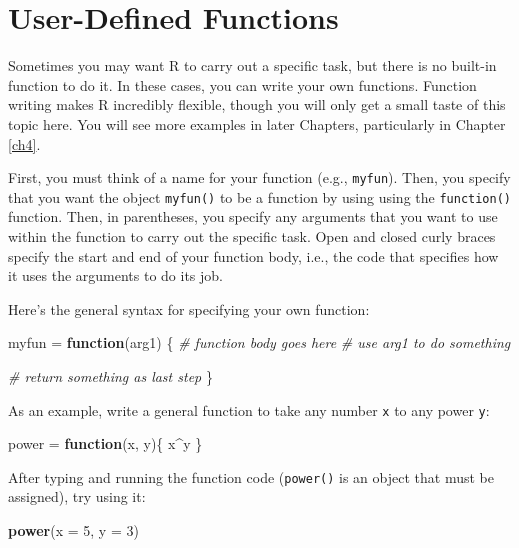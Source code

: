 \documentclass[]{book}
\newenvironment{Shaded}{\begin{snugshade}}{\end{snugshade}}
\newcommand{\KeywordTok}[1]{\textcolor[rgb]{0.13,0.29,0.53}{\textbf{#1}}}
\newcommand{\DataTypeTok}[1]{\textcolor[rgb]{0.13,0.29,0.53}{#1}}
\newcommand{\DecValTok}[1]{\textcolor[rgb]{0.00,0.00,0.81}{#1}}
\newcommand{\StringTok}[1]{\textcolor[rgb]{0.31,0.60,0.02}{#1}}
\newcommand{\CommentTok}[1]{\textcolor[rgb]{0.56,0.35,0.01}{\textit{#1}}}
\newcommand{\ControlFlowTok}[1]{\textcolor[rgb]{0.13,0.29,0.53}{\textbf{#1}}}
\newcommand{\OperatorTok}[1]{\textcolor[rgb]{0.81,0.36,0.00}{\textbf{#1}}}
\newcommand{\NormalTok}[1]{#1}
\theoremstyle{definition}
\theoremstyle{definition}
\theoremstyle{definition}
\theoremstyle{remark}
\begin{document}
\section{User-Defined Functions}\label{user-funcs}

Sometimes you may want R to carry out a specific task, but there is no
built-in function to do it. In these cases, you can write your own
functions. Function writing makes R incredibly flexible, though you will
only get a small taste of this topic here. You will see more examples in
later Chapters, particularly in Chapter \ref{ch4}.

First, you must think of a name for your function (e.g.,
\texttt{myfun}). Then, you specify that you want the object
\texttt{myfun()} to be a function by using using the \texttt{function()}
function. Then, in parentheses, you specify any arguments that you want
to use within the function to carry out the specific task. Open and
closed curly braces specify the start and end of your function body,
i.e., the code that specifies how it uses the arguments to do its job.

Here's the general syntax for specifying your own function:

\begin{Shaded}
\begin{Highlighting}[]
\NormalTok{myfun =}\StringTok{ }\ControlFlowTok{function}\NormalTok{(arg1) \{}
  \CommentTok{# function body goes here}
    \CommentTok{# use arg1 to do something}
  
  \CommentTok{# return something as last step}
\NormalTok{\}}
\end{Highlighting}
\end{Shaded}

As an example, write a general function to take any number \texttt{x} to
any power \texttt{y}:

\begin{Shaded}
\begin{Highlighting}[]
\NormalTok{power =}\StringTok{ }\ControlFlowTok{function}\NormalTok{(x, y)\{}
\NormalTok{  x}\OperatorTok{^}\NormalTok{y}
\NormalTok{\}}
\end{Highlighting}
\end{Shaded}

After typing and running the function code (\texttt{power()} is an
object that must be assigned), try using it:

\begin{Shaded}
\begin{Highlighting}[]
\KeywordTok{power}\NormalTok{(}\DataTypeTok{x =} \DecValTok{5}\NormalTok{, }\DataTypeTok{y =} \DecValTok{3}\NormalTok{)}
\end{Highlighting}
\end{Shaded}
\end{document}
